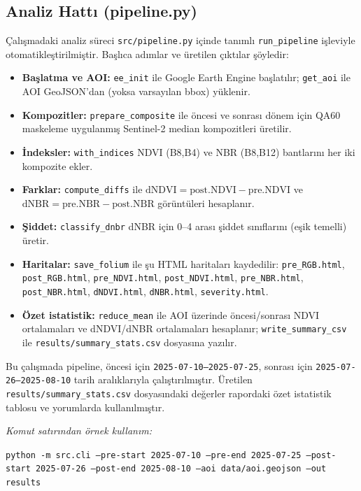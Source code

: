 \documentclass[11pt,a4paper]{article}
\begin{document}
\subsection*{Analiz Hattı (pipeline.py)}
Çalışmadaki analiz süreci \texttt{src/pipeline.py} içinde tanımlı \texttt{run\_pipeline} işleviyle otomatikleştirilmiştir. Başlıca adımlar ve üretilen çıktılar şöyledir:
\begin{itemize}
  \item \textbf{Başlatma ve AOI:} \texttt{ee\_init} ile Google Earth Engine başlatılır; \texttt{get\_aoi} ile AOI GeoJSON'dan (yoksa varsayılan bbox) yüklenir.
  \item \textbf{Kompozitler:} \texttt{prepare\_composite} ile öncesi ve sonrası dönem için QA60 maskeleme uygulanmış Sentinel-2 median kompozitleri üretilir.
  \item \textbf{İndeksler:} \texttt{with\_indices} NDVI (B8,B4) ve NBR (B8,B12) bantlarını her iki kompozite ekler.
  \item \textbf{Farklar:} \texttt{compute\_diffs} ile $\mathrm{dNDVI} = \mathrm{post.NDVI} - \mathrm{pre.NDVI}$ ve $\mathrm{dNBR} = \mathrm{pre.NBR} - \mathrm{post.NBR}$ görüntüleri hesaplanır.
  \item \textbf{Şiddet:} \texttt{classify\_dnbr} dNBR için 0–4 arası şiddet sınıflarını (eşik temelli) üretir.
  \item \textbf{Haritalar:} \texttt{save\_folium} ile şu HTML haritaları kaydedilir: \texttt{pre\_RGB.html}, \texttt{post\_RGB.html}, \texttt{pre\_NDVI.html}, \texttt{post\_NDVI.html}, \texttt{pre\_NBR.html}, \texttt{post\_NBR.html}, \texttt{dNDVI.html}, \texttt{dNBR.html}, \texttt{severity.html}.
  \item \textbf{Özet istatistik:} \texttt{reduce\_mean} ile AOI üzerinde öncesi/sonrası NDVI ortalamaları ve dNDVI/dNBR ortalamaları hesaplanır; \texttt{write\_summary\_csv} ile \texttt{results/summary\_stats.csv} dosyasına yazılır.
\end{itemize}

Bu çalışmada pipeline, öncesi için \texttt{2025-07-10--2025-07-25}, sonrası için \texttt{2025-07-26--2025-08-10} tarih aralıklarıyla çalıştırılmıştır. Üretilen \texttt{results/summary\_stats.csv} dosyasındaki değerler rapordaki özet istatistik tablosu ve yorumlarda kullanılmıştır.

\noindent \emph{Komut satırından örnek kullanım:}

\noindent\texttt{python -m src.cli --pre-start 2025-07-10 --pre-end 2025-07-25 --post-start 2025-07-26 --post-end 2025-08-10 --aoi data/aoi.geojson --out results}
\end{document}
